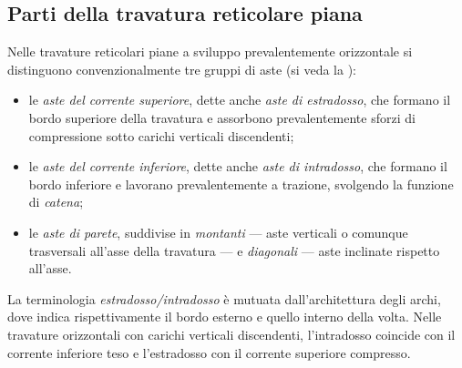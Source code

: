 \subsection{Parti della travatura reticolare piana}
\label{subsec:parti_travatura}

Nelle travature reticolari piane a sviluppo
prevalentemente orizzontale si distinguono
convenzionalmente tre gruppi di aste
(si veda la ):

\begin{itemize}
	\item le \emph{aste del corrente superiore},
	dette anche \emph{aste di estradosso},
	che formano il bordo superiore della
	travatura e assorbono prevalentemente
	sforzi di compressione sotto carichi
	verticali discendenti;
	
	\item le \emph{aste del corrente inferiore},
	dette anche \emph{aste di intradosso},
	che formano il bordo inferiore e lavorano
	prevalentemente a trazione, svolgendo la
	funzione di \emph{catena};
	
	\item le \emph{aste di parete}, suddivise in
	\emph{montanti} --- aste verticali o
	comunque trasversali all'asse della
	travatura --- e \emph{diagonali} --- aste
	inclinate rispetto all'asse.
\end{itemize}








\begin{oss}
	La terminologia \emph{estradosso/intradosso}
	è mutuata dall'architettura degli archi, dove
	indica rispettivamente il bordo esterno e
	quello interno della volta. Nelle travature
	orizzontali con carichi verticali discendenti,
	l'intradosso coincide con il corrente inferiore
	teso e l'estradosso con il corrente superiore
	compresso.
\end{oss}


